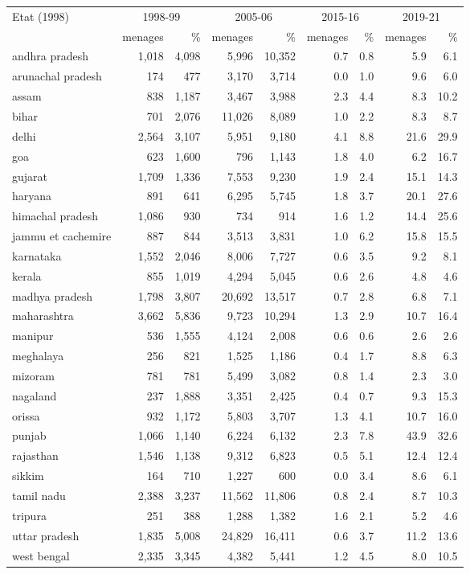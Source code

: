 \begin{tabular}{l*{8}{r}}
\toprule
Etat (1998) & \multicolumn{2}{c}{1998-99} & \multicolumn{2}{c}{2005-06} & \multicolumn{2}{c}{2015-16} & \multicolumn{2}{c}{2019-21} \\
 & menages & \% & menages & \% & menages & \% & menages & \% \\
\midrule
andhra pradesh & 1,018 & 4,098 & 5,996 & 10,352 & 0.7 & 0.8 & 5.9 & 6.1 \\
arunachal pradesh & 174 & 477 & 3,170 & 3,714 & 0.0 & 1.0 & 9.6 & 6.0 \\
assam & 838 & 1,187 & 3,467 & 3,988 & 2.3 & 4.4 & 8.3 & 10.2 \\
bihar & 701 & 2,076 & 11,026 & 8,089 & 1.0 & 2.2 & 8.3 & 8.7 \\
delhi & 2,564 & 3,107 & 5,951 & 9,180 & 4.1 & 8.8 & 21.6 & 29.9 \\
goa & 623 & 1,600 & 796 & 1,143 & 1.8 & 4.0 & 6.2 & 16.7 \\
gujarat & 1,709 & 1,336 & 7,553 & 9,230 & 1.9 & 2.4 & 15.1 & 14.3 \\
haryana & 891 & 641 & 6,295 & 5,745 & 1.8 & 3.7 & 20.1 & 27.6 \\
himachal pradesh & 1,086 & 930 & 734 & 914 & 1.6 & 1.2 & 14.4 & 25.6 \\
jammu et cachemire & 887 & 844 & 3,513 & 3,831 & 1.0 & 6.2 & 15.8 & 15.5 \\
karnataka & 1,552 & 2,046 & 8,006 & 7,727 & 0.6 & 3.5 & 9.2 & 8.1 \\
kerala & 855 & 1,019 & 4,294 & 5,045 & 0.6 & 2.6 & 4.8 & 4.6 \\
madhya pradesh & 1,798 & 3,807 & 20,692 & 13,517 & 0.7 & 2.8 & 6.8 & 7.1 \\
maharashtra & 3,662 & 5,836 & 9,723 & 10,294 & 1.3 & 2.9 & 10.7 & 16.4 \\
manipur & 536 & 1,555 & 4,124 & 2,008 & 0.6 & 0.6 & 2.6 & 2.6 \\
meghalaya & 256 & 821 & 1,525 & 1,186 & 0.4 & 1.7 & 8.8 & 6.3 \\
mizoram & 781 & 781 & 5,499 & 3,082 & 0.8 & 1.4 & 2.3 & 3.0 \\
nagaland & 237 & 1,888 & 3,351 & 2,425 & 0.4 & 0.7 & 9.3 & 15.3 \\
orissa & 932 & 1,172 & 5,803 & 3,707 & 1.3 & 4.1 & 10.7 & 16.0 \\
punjab & 1,066 & 1,140 & 6,224 & 6,132 & 2.3 & 7.8 & 43.9 & 32.6 \\
rajasthan & 1,546 & 1,138 & 9,312 & 6,823 & 0.5 & 5.1 & 12.4 & 12.4 \\
sikkim & 164 & 710 & 1,227 & 600 & 0.0 & 3.4 & 8.6 & 6.1 \\
tamil nadu & 2,388 & 3,237 & 11,562 & 11,806 & 0.8 & 2.4 & 8.7 & 10.3 \\
tripura & 251 & 388 & 1,288 & 1,382 & 1.6 & 2.1 & 5.2 & 4.6 \\
uttar pradesh & 1,835 & 5,008 & 24,829 & 16,411 & 0.6 & 3.7 & 11.2 & 13.6 \\
west bengal & 2,335 & 3,345 & 4,382 & 5,441 & 1.2 & 4.5 & 8.0 & 10.5 \\
\bottomrule
\end{tabular}
